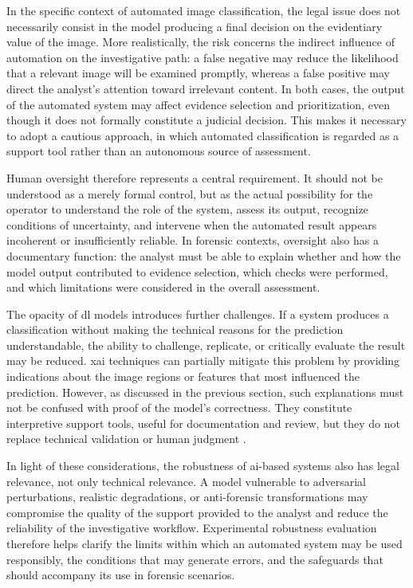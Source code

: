 In the specific context of automated image classification, the legal issue does
not necessarily consist in the model producing a final decision on the
evidentiary value of the image. More realistically, the risk concerns the
indirect influence of automation on the investigative path: a false negative
may reduce the likelihood that a relevant image will be examined promptly,
whereas a false positive may direct the analyst's attention toward irrelevant
content. In both cases, the output of the automated system may affect evidence
selection and prioritization, even though it does not formally constitute a
judicial decision. This makes it necessary to adopt a cautious approach, in
which automated classification is regarded as a support tool rather than an
autonomous source of assessment.

Human oversight therefore represents a central requirement. It should not be
understood as a merely formal control, but as the actual possibility for the
operator to understand the role of the system, assess its output, recognize
conditions of uncertainty, and intervene when the automated result appears
incoherent or insufficiently reliable. In forensic contexts, oversight also has
a documentary function: the analyst must be able to explain whether and how the
model output contributed to evidence selection, which checks were performed,
and which limitations were considered in the overall assessment.

The opacity of \gls{dl} models introduces further challenges. If a system
produces a classification without making the technical reasons for the
prediction understandable, the ability to challenge, replicate, or critically
evaluate the result may be reduced. \gls{xai} techniques can partially mitigate
this problem by providing indications about the image regions or features that
most influenced the prediction. However, as discussed in the previous section,
such explanations must not be confused with proof of the model's correctness.
They constitute interpretive support tools, useful for documentation and
review, but they do not replace technical validation or human judgment
\cite{Adadi2018,Doshi-Velez2017}.

In light of these considerations, the robustness of \gls{ai}-based systems also
has legal relevance, not only technical relevance. A model vulnerable to
adversarial perturbations, realistic degradations, or anti-forensic
transformations may compromise the quality of the support provided to the
analyst and reduce the reliability of the investigative workflow. Experimental
robustness evaluation therefore helps clarify the limits within which an
automated system may be used responsibly, the conditions that may generate
errors, and the safeguards that should accompany its use in forensic scenarios.

